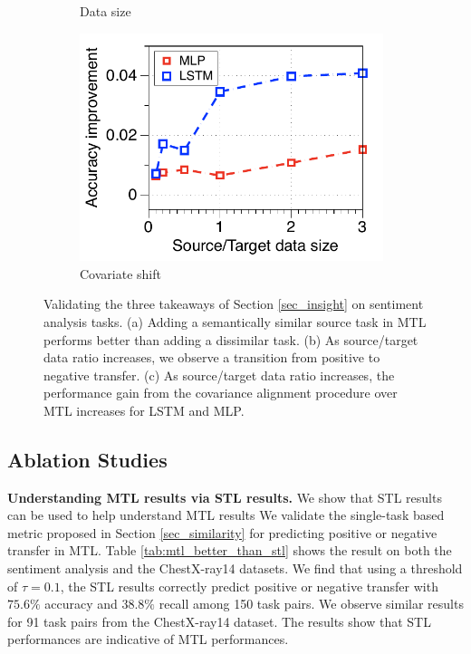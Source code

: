 \begin{figure}[!t]
\begin{subfigure}[b]{0.33\textwidth}
		\caption{Data size}
		\label{fig_ab_data}
	\end{subfigure}
	\begin{subfigure}[b]{0.33\textwidth}
		\centering
		\includegraphics[width=0.975\textwidth]{figures/ratio_alignment_norm_diff_all.pdf}
		\caption{Covariate shift}
		\label{fig_ab_cov}
	\end{subfigure}
	\caption{Validating the three takeaways of Section \ref{sec_insight} on sentiment analysis tasks. (a) Adding a semantically similar source task in MTL performs better than adding a dissimilar task.
	(b) As source/target data ratio increases, we observe a transition from positive to negative transfer.
	(c) As source/target data ratio increases, the performance gain from the covariance alignment procedure \cite{WZR20} over MTL increases for LSTM and MLP.}
	\label{fig_ablation}
	\vspace{-0.15in}
\end{figure}


\subsection{Ablation Studies}

\textbf{Understanding MTL results via STL results.}
We show that STL results can be used to help understand MTL results
We validate the single-task based metric proposed in Section \ref{sec_similarity} for predicting positive or negative transfer in MTL.
Table \ref{tab:mtl_better_than_stl} shows the result on both the sentiment analysis and the ChestX-ray14 datasets.
We find that using a threshold of $\tau = 0.1$, the STL results correctly predict positive or negative transfer with $75.6\%$ accuracy and $38.8\%$ recall among 150 task pairs.
We observe similar results for 91 task pairs from the ChestX-ray14 dataset.
The results show that STL performances are indicative of MTL performances.



